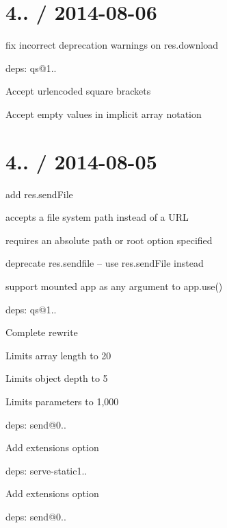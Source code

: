 {\ttfamily \section*{4.. / 2014-\/08-\/06 }}

{\ttfamily }

{\ttfamily 
\begin{DoxyItemize}
\item fix incorrect deprecation warnings on {\ttfamily res.\+download}
\item deps\+: qs@1..
\begin{DoxyItemize}
\item Accept urlencoded square brackets
\item Accept empty values in implicit array notation
\end{DoxyItemize}
\end{DoxyItemize}}

{\ttfamily \section*{4.. / 2014-\/08-\/05 }}

{\ttfamily }

{\ttfamily 
\begin{DoxyItemize}
\item add {\ttfamily res.\+send\+File}
\begin{DoxyItemize}
\item accepts a file system path instead of a U\+RL
\item requires an absolute path or {\ttfamily root} option specified
\end{DoxyItemize}
\item deprecate {\ttfamily res.\+sendfile} -- use {\ttfamily res.\+send\+File} instead
\item support mounted app as any argument to {\ttfamily app.\+use()}
\item deps\+: qs@1..
\begin{DoxyItemize}
\item Complete rewrite
\item Limits array length to 20
\item Limits object depth to 5
\item Limits parameters to 1,000
\end{DoxyItemize}
\item deps\+: send@0..
\begin{DoxyItemize}
\item Add {\ttfamily extensions} option
\end{DoxyItemize}
\item deps\+: serve-\/static1..
\begin{DoxyItemize}
\item Add {\ttfamily extensions} option
\item deps\+: send@0..
\end{DoxyItemize}
\end{DoxyItemize}}

